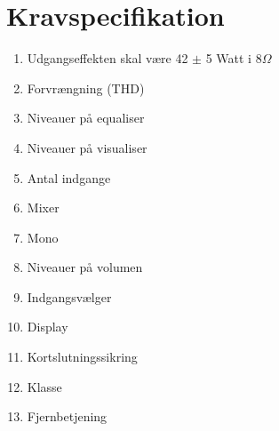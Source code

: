 \chapter{Kravspecifikation}

\begin{enumerate}
\item Udgangseffekten skal være 42 $\pm$ 5 Watt i 8$\Omega$
\item Forvrængning (THD)
\item Niveauer på equaliser
\item Niveauer på visualiser
\item Antal indgange
\item Mixer
\item Mono
\item Niveauer på volumen
\item Indgangsvælger
\item Display
\item Kortslutningssikring
\item Klasse
\item Fjernbetjening
\end{enumerate}